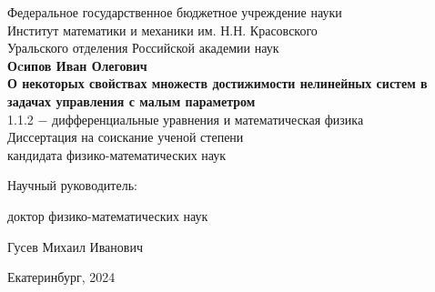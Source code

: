 \documentclass[../main.tex]{subfiles}
\begin{document}
	\begin{titlepage}
	    \begin{center}
		\large{Федеральное государственное бюджетное учреждение науки} \\
		\large{Институт математики и механики им. Н.Н. Красовского} \\ 
		\large{Уральского отделения Российской академии наук} \\ 
        \vspace*{4cm}
		\large{\textbf{Оcипов Иван Олегович}}\\
		\vspace*{1cm}
		\Large{\textbf{О некоторых свойствах множеств достижимости нелинейных систем в задачах управления с малым параметром}}\\
		\vspace*{1cm}
		\large{1.1.2 $-$ дифференциальные уравнения и математическая физика}\\
		\vspace*{1cm}
		\large{Диссертация на соискание ученой степени \\
		кандидата физико-математических наук}\\
		\end{center}
	    \vspace*{3cm}
	    
		\hspace*{82mm}\large{Научный руководитель:}

		\hspace*{82mm}\large{доктор физико-математических наук} 

		\hspace*{82mm}\large{Гусев Михаил Иванович}
		
		\vspace*{\fill}
		\begin{center}
	    \large{Екатеринбург, 2024}
	    \end{center}
	\end{titlepage}
\end{document}
